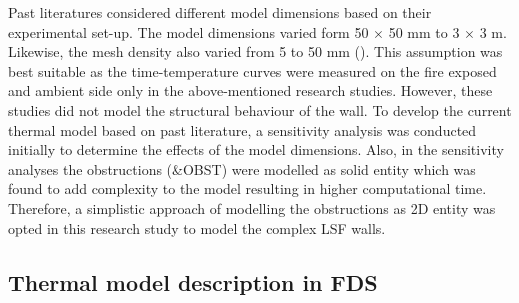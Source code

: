 Past literatures considered different model dimensions based on their experimental set-up. The model dimensions varied form 50 $\times$ 50 mm to 3 $\times$ 3 m. Likewise, the mesh density also varied from 5 to 50 mm (\citet{Lazaro2018,Nguyen2018}). This assumption was best suitable as the time-temperature curves were measured on the fire exposed and ambient side only in the above-mentioned research studies. However, these studies did not model the structural behaviour of the wall. To develop the current thermal model based on past literature, a sensitivity analysis was conducted initially to determine the effects of the model dimensions. Also, in the sensitivity analyses the obstructions (\&OBST) were modelled as solid entity which was found to add complexity to the model resulting in higher computational time. Therefore, a simplistic approach of modelling the obstructions as 2D entity was opted in this research study to model the complex LSF walls. 

\subsection{Thermal model description in FDS}

